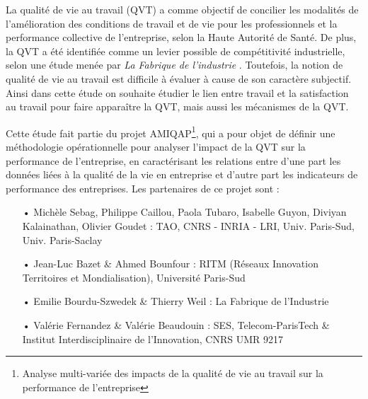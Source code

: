 \documentclass[11pt,fleqn,openany,frenchb]{book} %
\begin{document}
La qualité de vie au travail (QVT) a comme objectif de concilier les modalités de l’amélioration des conditions de travail et de vie pour les professionnels et la performance collective de l’entreprise, selon la Haute Autorité de Santé. De plus, la QVT a été identifiée comme un levier possible de compétitivité industrielle, selon une étude menée par \textit{La Fabrique de l'industrie} \cite{bourdu2016qvt}. Toutefois, la notion de qualité de vie au travail est difficile à évaluer à cause de son caractère subjectif. Ainsi dans cette étude on souhaite étudier le lien entre travail et la satisfaction au travail pour faire apparaître la QVT, mais aussi les mécanismes  de la QVT.\par %
Cette étude fait partie du projet AMIQAP\footnote{Analyse multi-variée des impacts de la qualité de vie au travail sur la performance de l’entreprise}, qui a pour objet de définir une méthodologie opérationnelle pour analyser l’impact de la QVT sur la performance de l’entreprise, en caractérisant les relations entre d’une part les données liées à la qualité de la vie en entreprise  et d’autre part les indicateurs de performance des entreprises. Les partenaires de ce projet sont :\\ 
\begin{itemize}
\item[•] Michèle Sebag, Philippe Caillou, Paola Tubaro, Isabelle Guyon, Diviyan Kalainathan, Olivier Goudet : 
TAO, CNRS - INRIA - LRI, Univ. Paris-Sud, Univ. Paris-Saclay
\item[•] Jean-Luc Bazet \& Ahmed Bounfour :  RITM (Réseaux Innovation Territoires et Mondialisation), Université Paris-Sud
\item[•] Emilie Bourdu-Szwedek \& Thierry Weil : La Fabrique de l'Industrie
\item[•] Valérie Fernandez \& Valérie Beaudouin : SES, Telecom-ParisTech
\& Institut Interdisciplinaire de l'Innovation, CNRS UMR 9217\\
\end{itemize}
\end{document}
